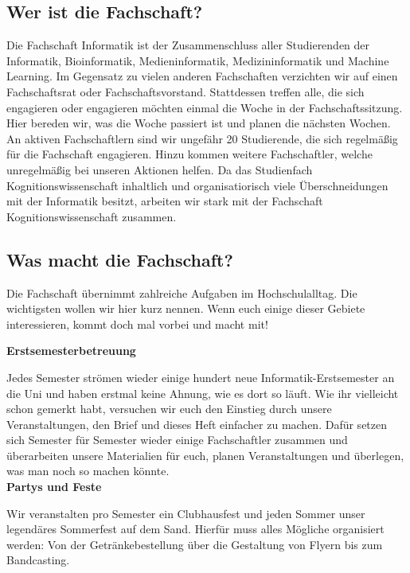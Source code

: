 \subsection{Wer ist die Fachschaft?}
Die Fachschaft Informatik ist der Zusammenschluss aller Studierenden der
Informatik, Bioinformatik, Medieninformatik, Medizininformatik und Machine Learning. 
Im Gegensatz zu vielen anderen Fachschaften verzichten wir auf einen
Fachschaftsrat oder Fachschaftsvorstand. Stattdessen treffen alle, die sich
engagieren oder engagieren möchten einmal die Woche in der Fachschaftssitzung.
Hier bereden wir, was die Woche passiert ist und planen die nächsten Wochen. An
aktiven Fachschaftlern sind wir ungefähr 20 Studierende, die sich regelmäßig
für die Fachschaft engagieren. Hinzu kommen weitere Fachschaftler, welche
unregelmäßig bei unseren Aktionen helfen. Da das Studienfach Kognitionswissenschaft inhaltlich und organisatiorisch viele
Überschneidungen mit der Informatik besitzt, arbeiten wir stark mit der Fachschaft Kognitionswissenschaft zusammen.

\subsection{Was macht die Fachschaft?}
Die Fachschaft übernimmt zahlreiche Aufgaben im Hochschulalltag. Die
wichtigsten wollen wir hier kurz nennen. Wenn euch einige dieser Gebiete
interessieren, kommt doch mal vorbei und macht mit!

\textbf{Erstsemesterbetreuung}

Jedes Semester strömen wieder einige hundert neue Informatik-Erstsemester an
die Uni und haben erstmal keine Ahnung, wie es dort so läuft. Wie ihr
vielleicht schon gemerkt habt, versuchen wir euch den Einstieg durch unsere
Veranstaltungen, den Brief und dieses Heft einfacher zu machen. Dafür setzen
sich Semester für Semester wieder einige Fachschaftler zusammen und
überarbeiten unsere Materialien für euch, planen Veranstaltungen und überlegen,
was man noch so machen könnte.\\ 

\textbf{Partys und Feste}

Wir veranstalten pro Semester ein Clubhausfest und jeden Sommer unser
legendäres Sommerfest auf dem Sand. Hierfür muss alles Mögliche organisiert
werden: Von der Getränkebestellung über die Gestaltung von Flyern bis zum
Bandcasting. \\

